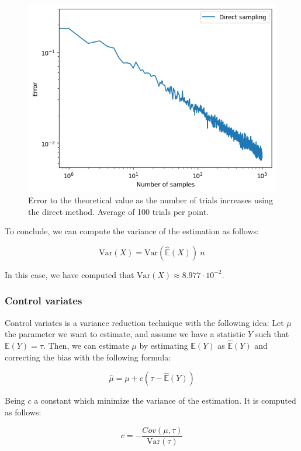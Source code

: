 \documentclass{article}
\begin{document}
\begin{figure}[H]
	\centering
	\includegraphics[width=0.5\linewidth]{./Figures/VarianceReduction/direct.png}
	\caption{Error to the theoretical value as the number of trials increases using the direct method. Average of 100 trials per point.}
	\label{fig:directmethod}
\end{figure}

To conclude, we can compute the variance of the estimation as follows:

\begin{equation} 
	\label{eq:variancedirectmethod} 
	\mathrm{Var}(X) = \mathrm{Var}(\hat{\mathbb{E}}(X)) \ n 
\end{equation}

In this case, we have computed that \(\mathrm{Var}(X) \approx 8.977 \cdot 10^{-2}\).

\subsubsection{Control variates}
\label{sec:control_variates}

Control variates is a variance reduction technique with the following idea: Let \(\mu\) the parameter we want to estimate, and assume we have a statistic \(Y\) such that \(\mathbb{E}(Y) = \tau\). Then, we can estimate \(\mu\) by estimating \(\mathbb{E}(Y)\) as \(\hat{\mathbb{E}}(Y)\) and correcting the bias with the following formula:

\begin{equation} 
	\label{eq:controlvariates} 
	\hat{\mu} = \mu + c(\tau - \hat{\mathbb{E}}(Y)) 
\end{equation}

Being \(c\) a constant which minimize the variance of the estimation. It is computed as follows:

\begin{equation} 
	\label{eq:controlvariatesconstant} 
	c = -\frac{Cov(\mu, \tau)}{\mathrm{Var}(\tau)}
\end{equation}
\end{document}
